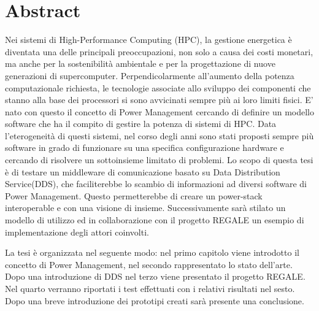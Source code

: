 \section*{Abstract}
\label{TODO}
Nei sistemi di High-Performance Computing (HPC), la gestione energetica è diventata una delle principali preoccupazioni, non solo a causa dei costi monetari, ma anche per la sostenibilità ambientale e per la progettazione di nuove generazioni di supercomputer\cite{TODO}. Perpendicolarmente all'aumento della potenza computazionale richiesta, le tecnologie associate allo sviluppo dei componenti che stanno alla base dei processori si sono avvicinati sempre più ai loro limiti fisici. E' nato con questo il concetto di Power Management cercando di definire un modello software che ha il compito di gestire la potenza di sistemi di HPC. Data l'eterogeneità di questi sistemi,
nel corso degli anni sono stati proposti sempre più software in grado di funzionare su una specifica configurazione hardware e cercando di risolvere un sottoinsieme limitato di problemi. Lo scopo di questa tesi è di testare un middleware di comunicazione basato su Data Distribution Service(DDS), che faciliterebbe lo scambio di informazioni ad diversi software di Power Management. Questo permetterebbe di creare un power-stack interoperable e con una visione di insieme. Successivamente sarà stilato un modello di utilizzo ed in collaborazione con il progetto REGALE un esempio di implementazione degli attori coinvolti.

La tesi è organizzata nel seguente modo: nel primo capitolo viene introdotto il concetto di Power Management, nel secondo rappresentato lo stato dell'arte. Dopo una introduzione di DDS nel terzo viene presentato il progetto REGALE. Nel quarto verranno riportati i test effettuati con i relativi risultati nel sesto. Dopo una breve introduzione dei prototipi creati sarà presente una conclusione.


